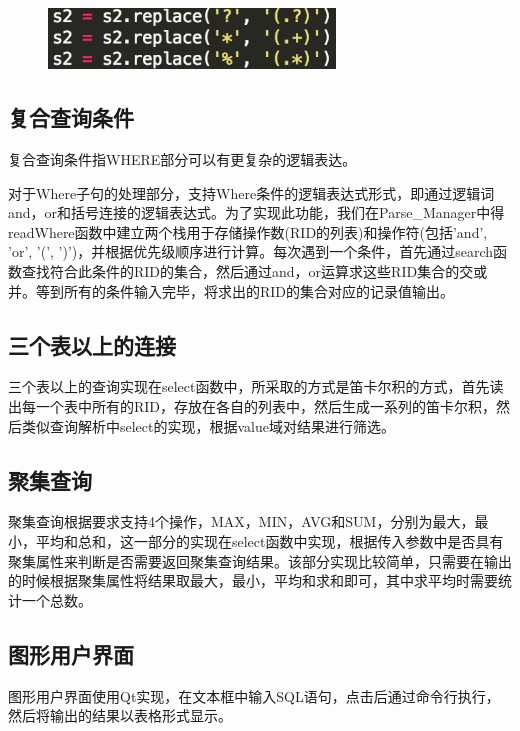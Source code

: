 \begin{figure}[H]
\centering
\includegraphics[width=3in]{Figures/vague.png}
\end{figure}

\subsection{复合查询条件}

复合查询条件指WHERE部分可以有更复杂的逻辑表达。

对于Where子句的处理部分，支持Where条件的逻辑表达式形式，即通过逻辑词and，or和括号连接的逻辑表达式。为了实现此功能，我们在Parse\_Manager中得readWhere函数中建立两个栈用于存储操作数(RID的列表)和操作符(包括'and', 'or', '(', ')')，并根据优先级顺序进行计算。每次遇到一个条件，首先通过search函数查找符合此条件的RID的集合，然后通过and，or运算求这些RID集合的交或并。等到所有的条件输入完毕，将求出的RID的集合对应的记录值输出。

\subsection{三个表以上的连接}
三个表以上的查询实现在select函数中，所采取的方式是笛卡尔积的方式，首先读出每一个表中所有的RID，存放在各自的列表中，然后生成一系列的笛卡尔积，然后类似查询解析中select的实现，根据value域对结果进行筛选。

\subsection{聚集查询}
聚集查询根据要求支持4个操作，MAX，MIN，AVG和SUM，分别为最大，最小，平均和总和，这一部分的实现在select函数中实现，根据传入参数中是否具有聚集属性来判断是否需要返回聚集查询结果。该部分实现比较简单，只需要在输出的时候根据聚集属性将结果取最大，最小，平均和求和即可，其中求平均时需要统计一个总数。

\subsection{图形用户界面}
图形用户界面使用Qt实现，在文本框中输入SQL语句，点击后通过命令行执行，然后将输出的结果以表格形式显示。
